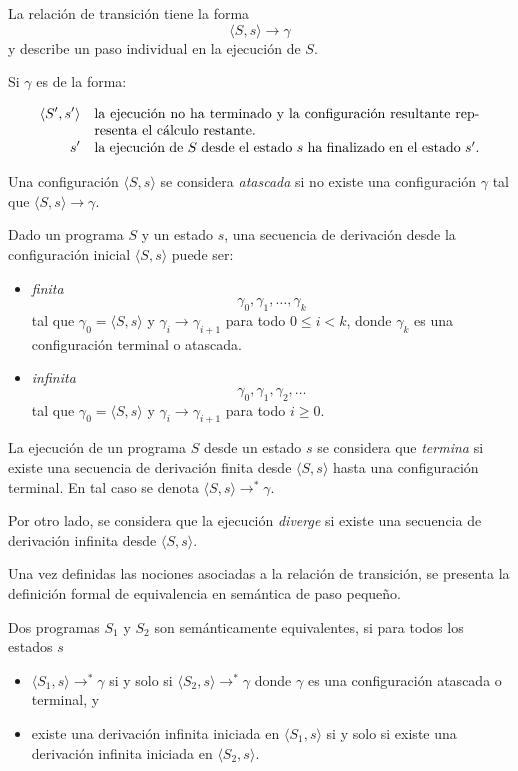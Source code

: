 La relación de transición tiene la forma
\[
\langle S, s \rangle \to \gamma
\]
y describe un paso individual en la ejecución de \(S\). 

Si \(\gamma\) es de la forma:

\[
\begin{aligned}
\langle S', s' \rangle &\quad \parbox[t]{0.8\columnwidth}{%
la ejecución no ha terminado y la configuración resultante representa el cálculo restante.} \\
s' &\quad \parbox[t]{0.8\columnwidth}{la ejecución de \(S\) desde el estado \(s\) ha finalizado en el estado \(s'\).}
\end{aligned}
\]


Una configuración \(\langle S, s \rangle\) se considera \emph{atascada} si no existe  una configuración \(\gamma\) tal que $\langle S, s \rangle \to \gamma$.

Dado un programa $S$ y un estado $s$, una secuencia de derivación desde la configuración inicial $\langle S,s\rangle$ puede ser:

\begin{itemize}
    \item \emph{finita} 
    \[\gamma_0,\gamma_1,\ldots,\gamma_k\]
    tal que $\gamma_0=\langle S,s\rangle$ y
    $\gamma_i \to \gamma_{i+1}$ para todo
    $0\leq i<k$, donde $\gamma_k$ es una
    configuración terminal o atascada.

    \item \emph{infinita} 
    \[
    \gamma_0,\gamma_1,\gamma_2,\ldots
    \]
    tal que $\gamma_0=\langle S,s\rangle$ y
    $\gamma_i \to \gamma_{i+1}$ para todo
    $i\geq 0$.
\end{itemize}

La ejecución de un programa $S$ desde un estado $s$ se considera que \emph{termina} si existe una secuencia de derivación finita
desde $\langle S,s\rangle$ hasta una configuración terminal. En tal caso se denota $\langle S,s\rangle \to^{*} \gamma$.

Por otro lado, se considera que la ejecución \emph{diverge} si existe una secuencia de derivación infinita
desde $\langle S,s\rangle$.


Una vez definidas las nociones asociadas a la relación de transición, se presenta la definición formal de equivalencia en semántica de paso pequeño.

\begin{definition}
Dos programas $S_1$ y $S_2$ son semánticamente equivalentes, si para todos los estados $s$

\begin{itemize}
    \item $\langle S_1, s \rangle \to ^* \gamma $ si y solo si $\langle S_2, s \rangle \to ^* \gamma$ donde $\gamma$ es una configuración atascada o terminal, y 
    \item existe una derivación infinita iniciada en $\langle S_1, s \rangle$ si y solo si existe una derivación infinita iniciada en $\langle S_2, s \rangle$. 
\end{itemize}
\end{definition}

